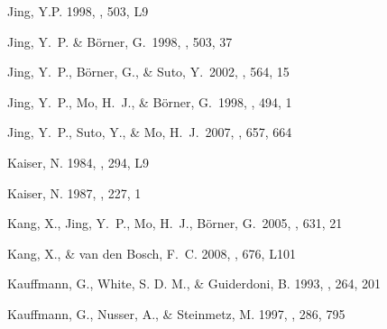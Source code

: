 \documentclass[]{emulateapj}
\begin{document}
\begin{thebibliography}{999}

Jing, Y.P. 1998, \apj, 503, L9

Jing, Y.\ P. \& B\"{o}rner, G.\ 1998, \apj, 503, 37

Jing, Y.\ P., B\"{o}rner, G., \& Suto, Y.\ 2002, \apj, 564, 15

Jing, Y.\ P., Mo, H.\ J., \& B\"{o}rner, G.\ 1998, \apj, 494, 1

Jing, Y.~P., Suto, Y., \& Mo, H.~J.\ 2007, \apj, 657, 664

Kaiser, N. 1984, \apj, 294, L9

Kaiser, N. 1987, \mnras, 227, 1

Kang, X., Jing, Y.~P., Mo, H.~J., B\"orner, G.\ 2005, \apj, 631, 21 

Kang, X., \& van den Bosch, F.\ C. 2008, \apj, 676, L101 

Kauffmann, G., White, S. D. M., \& Guiderdoni, B. 1993, \mnras, 264, 201

Kauffmann, G., Nusser, A., \& Steinmetz, M. 1997, \mnras, 286, 795


\end{thebibliography}
\end{document}
